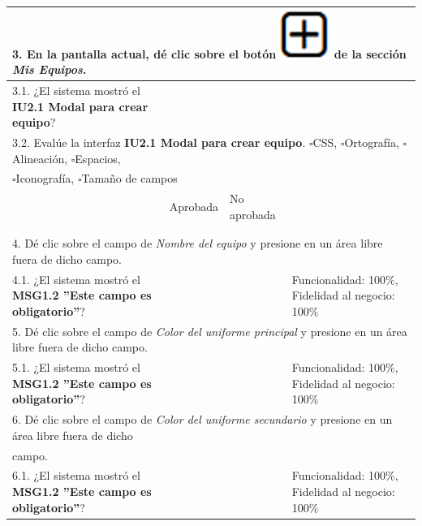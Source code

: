 \documentclass[oneside,10pt]{book}
\begin{document}
\begin{tabularx}{\textwidth}{ X l l X }
\multicolumn{4}{|l|}{3. En la pantalla actual, dé clic sobre el botón \includegraphics[scale=.3]{images/add} de la sección \textit{Mis Equipos}.} \\ \hline
\multicolumn{1}{|X|}{3.1. ¿El sistema mostró el \textbf{IU2.1 Modal para crear equipo}?} & \multicolumn{1}{l|}{}   & \multicolumn{1}{l|}{}   & \multicolumn{1}{X|}{}              \\ \hline

\multicolumn{4}{|l|}{3.2. Evalúe la interfaz \textbf{IU2.1 Modal para crear equipo}. $\square$CSS, $\square$Ortografía, $\square$Alineación, $\square$Espacios,}                        \\
\multicolumn{4}{|l|}{$\square$Iconografía, $\square$Tamaño de campos}                        \\ \hline
\multicolumn{1}{|l|}{ }	& \multicolumn{1}{l|}{Aprobada} & \multicolumn{1}{l|}{No aprobada} & \multicolumn{1}{l|}{ } \\ \hline
\multicolumn{1}{|l|}{ } & \multicolumn{1}{l|}{ } & \multicolumn{1}{l|}{ } & \multicolumn{1}{l|}{ } \\
\multicolumn{1}{|l|}{ } & \multicolumn{1}{l|}{ } & \multicolumn{1}{l|}{ } & \multicolumn{1}{l|}{ } \\ \hline

\multicolumn{4}{|l|}{4. Dé clic sobre el campo de \textit{Nombre del equipo} y presione en un área libre fuera de dicho campo.}              \\ \hline
\multicolumn{1}{|X|}{4.1. ¿El sistema mostró el \textbf{MSG1.2 ''Este campo es obligatorio''}?} & \multicolumn{1}{l|}{}   & \multicolumn{1}{l|}{}   & \multicolumn{1}{X|}{Funcionalidad: 100\%, Fidelidad al negocio: 100\%}              \\ \hline

\multicolumn{4}{|l|}{5. Dé clic sobre el campo de \textit{Color del uniforme principal} y presione en un área libre fuera de dicho campo.}              \\ \hline
\multicolumn{1}{|X|}{5.1. ¿El sistema mostró el \textbf{MSG1.2 ''Este campo es obligatorio''}?} & \multicolumn{1}{l|}{}   & \multicolumn{1}{l|}{}   & \multicolumn{1}{X|}{Funcionalidad: 100\%, Fidelidad al negocio: 100\%}              \\ \hline

\multicolumn{4}{|l|}{6. Dé clic sobre el campo de \textit{Color del uniforme secundario} y presione en un área libre fuera de dicho}              \\
\multicolumn{4}{|l|}{campo.}              \\ \hline
\multicolumn{1}{|X|}{6.1. ¿El sistema mostró el \textbf{MSG1.2 ''Este campo es obligatorio''}?} & \multicolumn{1}{l|}{}   & \multicolumn{1}{l|}{}   & \multicolumn{1}{X|}{Funcionalidad: 100\%, Fidelidad al negocio: 100\%}              \\ \hline


\end{tabularx}
\end{document}
